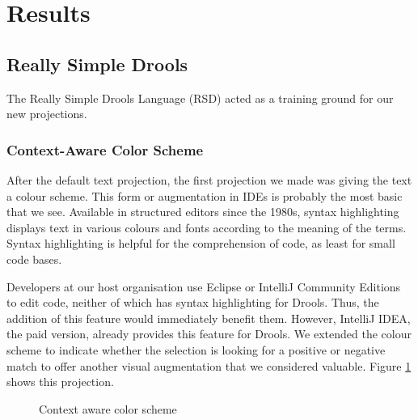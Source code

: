\section{Results}
\label{section:dsr_results}

\subsection{Really Simple Drools}

The Really Simple Drools Language (RSD) acted as a training ground for our new projections.

\subsubsection{Context-Aware Color Scheme}
After the default text projection, the first projection we made was giving the text a colour scheme.
This form or augmentation in IDEs is probably the most basic that we see.
Available in structured editors since the 1980s\cite{cowlishaw1987lexx}, syntax highlighting displays text in various colours and fonts according to the meaning of the terms.
Syntax highlighting is helpful for the comprehension of code, as least for small code bases\cite{sarkar2015impact}.

Developers at our host organisation use Eclipse or IntelliJ Community Editions to edit code, neither of which has syntax highlighting for Drools. Thus, the addition of this feature would immediately benefit them.
However, IntelliJ IDEA, the paid version, already provides this feature for Drools.
We extended the colour scheme to indicate whether the selection is looking for a positive or negative match to offer another visual augmentation that we considered valuable.
Figure \ref{fig:colorscheme} shows this projection.

\begin{figure}[h]
    \centering
    \caption{Context aware color scheme}
    \label{fig:colorscheme}
\end{figure}

